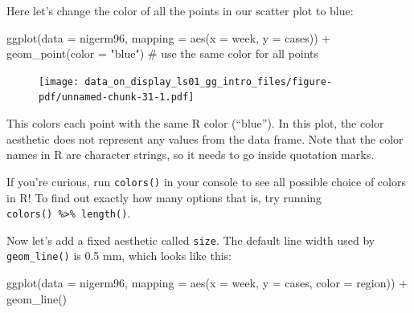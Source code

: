 \documentclass[
  letterpaper,
  DIV=11,
  numbers=noendperiod]{scrreprt}
\newenvironment{Shaded}{\begin{snugshade}}{\end{snugshade}}
\newcommand{\AttributeTok}[1]{\textcolor[rgb]{0.40,0.45,0.13}{#1}}
\newcommand{\CommentTok}[1]{\textcolor[rgb]{0.37,0.37,0.37}{#1}}
\newcommand{\FunctionTok}[1]{\textcolor[rgb]{0.28,0.35,0.67}{#1}}
\newcommand{\NormalTok}[1]{\textcolor[rgb]{0.00,0.23,0.31}{#1}}
\newcommand{\SpecialCharTok}[1]{\textcolor[rgb]{0.37,0.37,0.37}{#1}}
\newcommand{\StringTok}[1]{\textcolor[rgb]{0.13,0.47,0.30}{#1}}
\begin{document}
Here let's change the color of all the points in our scatter plot to
blue:

\begin{Shaded}
\begin{Highlighting}[]
\FunctionTok{ggplot}\NormalTok{(}\AttributeTok{data =}\NormalTok{ nigerm96, }
       \AttributeTok{mapping =} \FunctionTok{aes}\NormalTok{(}\AttributeTok{x =}\NormalTok{ week, }
                     \AttributeTok{y =}\NormalTok{ cases)) }\SpecialCharTok{+}
  \FunctionTok{geom\_point}\NormalTok{(}\AttributeTok{color =} \StringTok{"blue"}\NormalTok{)        }\CommentTok{\# use the same color for all points}
\end{Highlighting}
\end{Shaded}

\begin{figure}[H]

{\centering \texttt{[image: data\_on\_display\_ls01\_gg\_intro\_files/figure-pdf/unnamed-chunk-31-1.pdf]}

}

\end{figure}

This colors each point with the same R color (``blue''). In this plot,
the color aesthetic does not represent any values from the data frame.
Note that the color names in R are character strings, so it needs to go
inside quotation marks.

\begin{tcolorbox}[enhanced jigsaw, colframe=quarto-callout-note-color-frame, colbacktitle=quarto-callout-note-color!10!white, titlerule=0mm, opacitybacktitle=0.6, breakable, toprule=.15mm, arc=.35mm, rightrule=.15mm, colback=white, bottomrule=.15mm, opacityback=0, toptitle=1mm, left=2mm, bottomtitle=1mm, title=\textcolor{quarto-callout-note-color}{\faInfo}\hspace{0.5em}{Side Note}, leftrule=.75mm, coltitle=black]

If you're curious, run \texttt{colors()} in your console to see all
possible choice of colors in R! To find out exactly how many options
that is, try running \texttt{colors()\ \%\textgreater{}\%\ length()}.

\end{tcolorbox}

Now let's add a fixed aesthetic called \texttt{size}. The default line
width used by \texttt{geom\_line()} is 0.5 mm, which looks like this:

\begin{Shaded}
\begin{Highlighting}[]
\FunctionTok{ggplot}\NormalTok{(}\AttributeTok{data =}\NormalTok{ nigerm96, }
             \AttributeTok{mapping =} \FunctionTok{aes}\NormalTok{(}\AttributeTok{x =}\NormalTok{ week, }
                           \AttributeTok{y =}\NormalTok{ cases,}
                           \AttributeTok{color =}\NormalTok{ region)) }\SpecialCharTok{+} 
      \FunctionTok{geom\_line}\NormalTok{()}
\end{Highlighting}
\end{Shaded}
\end{document}
